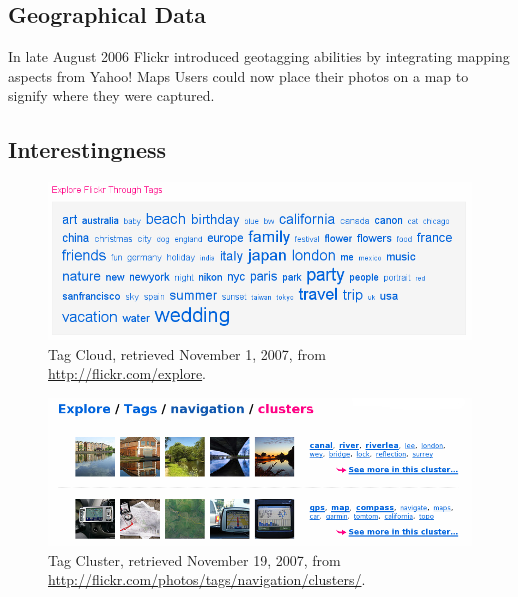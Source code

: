 \subsection{Geographical Data}

In late August 2006 Flickr introduced geotagging abilities
\citep{butterfield06} by integrating mapping aspects from Yahoo! Maps%
Users could now place their photos on a
map to signify where they were captured.

\subsection{Interestingness}

\begin{figure}
  \begin{whole}
    \includegraphics[width=\wholewidth]{scrsh_flickr_tagcloud}
    \caption[Flickr Tag Cloud]{%
       Tag Cloud,
       retrieved November 1, 2007, from \url{http://flickr.com/explore}.}
    \label{figure:scrsh.flickr.tagcloud}
  \end{whole}
\end{figure}

\begin{figure}
  \begin{whole}
    \includegraphics[width=\wholewidth]{scrsh_flickr_tagcluster}
    \caption[Flickr Tag Cluster]{%
       Tag Cluster,
       retrieved November 19, 2007, from
       \url{http://flickr.com/photos/tags/navigation/clusters/}.}
    \label{figure:scrsh.flickr.tagcluster}
  \end{whole}
\end{figure}

